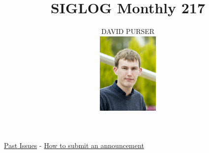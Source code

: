 \documentclass[prodmode,acmtecs]{acmsmall} %
\newcounter{colstart}
\begin{document}
\setcounter{colstart}{\thepage}

\title{\huge\sc SIGLOG Monthly 217}
\author{DAVID PURSER
\vspace*{-2.6cm}\begin{flushright}\includegraphics[width=30mm]{dp}\end{flushright}
}

\maketitlee

\href{https://lics.siglog.org/newsletters/}{Past Issues}
 - 
\href{https://lics.siglog.org/newsletters/inst.html}{How to submit an announcement}
\end{document}

